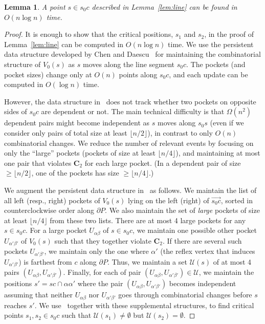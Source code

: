 \documentclass[12pt]{article}
\newcommand{\floor}[1]{{\lfloor #1 \rfloor}}
\newtheorem{lemma}{Lemma}
\begin{document}
\begin{lemma}\label{lem:line2}
A point $s\in s_0c$ described in Lemma~\ref{lem:line} can be found in $O(n \log n)$ time.
\end{lemma}
\begin{proof}
It is enough to show that the critical positions, $s_1$ and $s_2$, in the proof of Lemma~\ref{lem:line} can be computed in $O(n\log n)$ time. We use the persistent data structure developed
by Chen and Daescu~\cite{CD98} for maintaining the combinatorial structure of $V_0(s)$ as $s$ moves along the line segment $s_0c$. The pockets (and pocket sizes) change only at $O(n)$ points
along $s_0c$, and each update can be computed in $O(\log n)$ time.

However, the data structure in~\cite{CD98} does not track whether two pockets on opposite sides
of $s_0c$ are dependent or not. The main technical difficulty is that $\Omega(n^2)$ dependent pairs might become independent as $s$ moves along $s_0s$ (even if we consider only pairs of total  size at least $\floor{n/2}$), in contrast to only $O(n)$ combinatorial changes. We reduce the number of relevant events by focusing on only the ``large'' pockets (pockets of size at least $\floor{n/4}$), and maintaining at most one pair that violates $\mathbf{C}_2$ for each large pocket. (In a dependent pair of size $\geq \floor{n/2}$, one of the pockets has size $\geq \floor{n/4}$.)

We augment the persistent data structure in~\cite{CD98} as follows. We maintain the list of all left (resp., right) pockets of $V_0(s)$ lying on the left (right) of $\overrightarrow{s_0c}$, sorted in counterclockwise order along $\partial P$. We also maintain the set of \emph{large} pockets of size at least $\floor{n/4}$ from these two lists. There are at most 4 large pockets for any $s\in s_0c$.
For a large pocket $U_{\alpha\beta}$ of $s\in s_0c$, we maintain one possible other pocket $U_{\alpha'\beta'}$ of $V_0(s)$ such that they together violate $\mathbf{C}_2$. If there are several such pockets $U_{\alpha'\beta'}$, we maintain only the one where $\alpha'$ (the reflex vertex that induces $U_{\alpha'\beta'}$) is farthest from $c$ along $\partial P$. Thus, we maintain a set $\mathcal{U}(s)$ of at most 4 pairs $(U_{\alpha\beta}, U_{\alpha'\beta'})$. Finally, for each of pair $(U_{\alpha\beta}, U_{\alpha'\beta'})\in \mathcal{U}$, we maintain the positions $s'= sc\cap \alpha\alpha'$ where the pair $(U_{\alpha\beta}, U_{\alpha'\beta'})$ becomes independent assuming that neither $U_{\alpha\beta}$ nor $U_{\alpha'\beta'}$ goes through combinatorial changes before $s$ reaches $s'$. We use~\cite{CD98} together with these supplemental structures, to find critical points $s_1,s_2\in  s_0c$ such that $\mathcal{U}(s_1)\neq \emptyset$ but $\mathcal{U}(s_2)=\emptyset$.


\end{proof}
\end{document}
